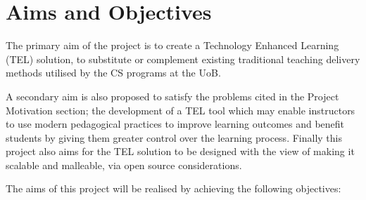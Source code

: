 \section{Aims and Objectives}
\label{sec1:sec02}

The primary aim of the project is to create a Technology Enhanced Learning (TEL) solution, to substitute or complement existing traditional teaching delivery methods utilised by the CS programs at the UoB.

A secondary aim is also proposed to satisfy the problems cited in the Project Motivation section; the development of a TEL tool which may enable instructors to use modern pedagogical practices to improve learning outcomes and benefit students by giving them greater control over the learning process. Finally this project also aims for the TEL solution to be designed with the view of making it scalable and malleable, via open source considerations.

\newpage
The aims of this project will be realised by achieving the following objectives:

